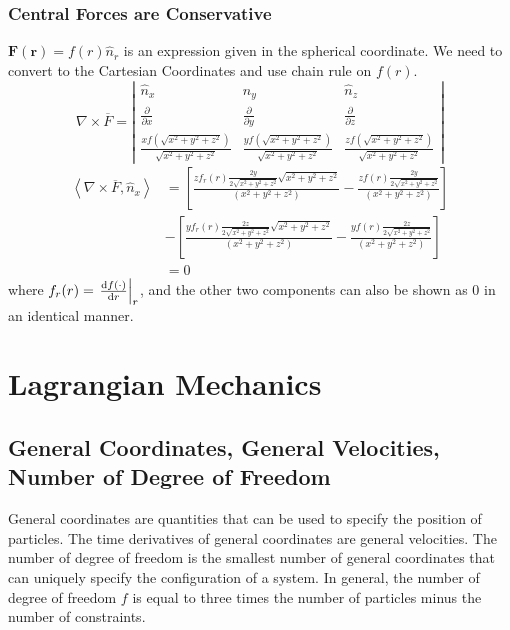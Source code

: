 \documentclass[a4paper,12pt,titlepage]{article}
\begin{document}
\subsubsection{Central Forces are Conservative}
$\mathbf{F(\mathbf{r})}=f(r)\hat{n}_r$ is an expression given in the spherical coordinate. We need to convert to the Cartesian Coordinates and use chain rule on $f(r)$.
\[\nabla\times\overline{F}=\left|\begin{matrix}\hat{n}_x&\hat{n}_y&\hat{n}_z\\\frac{\partial}{\partial x}&\frac{\partial}{\partial y}&\frac{\partial}{\partial z}\\\frac{xf(\sqrt{x^2+y^2+z^2})}{\sqrt{x^2+y^2+z^2}}&\frac{yf(\sqrt{x^2+y^2+z^2})}{\sqrt{x^2+y^2+z^2}}&\frac{zf(\sqrt{x^2+y^2+z^2})}{\sqrt{x^2+y^2+z^2}}\end{matrix}\right|\]
\begin{align*}\left<\nabla\times\overline{F},\hat n_x\right>&=\left[\frac{zf_r(r)\frac{2y}{2\sqrt{x^2+y^2+z^2}}\sqrt{x^2+y^2+z^2}}{(x^2+y^2+z^2)}-\frac{zf(r)\frac{2y}{2\sqrt{x^2+y^2+z^2}}}{(x^2+y^2+z^2)}\right]\\&-\left[\frac{yf_r(r)\frac{2z}{2\sqrt{x^2+y^2+z^2}}\sqrt{x^2+y^2+z^2}}{(x^2+y^2+z^2)}-\frac{yf(r)\frac{2z}{2\sqrt{x^2+y^2+z^2}}}{(x^2+y^2+z^2)}\right]\\
&=0
\end{align*}
where $f_r(r)=\left.\frac{\mathrm{d} f(\cdot)}{\mathrm{d} r}\right|_{r}$, and the other two components can also be shown as $0$ in an identical manner.
\section{Lagrangian Mechanics}
\subsection{General Coordinates, General Velocities, Number of Degree of Freedom}
General coordinates are quantities that can be used to specify the position of particles. The time derivatives of general coordinates are general velocities.
The number of degree of freedom is the smallest number of general coordinates that can uniquely specify the configuration of a system. In general, the number of degree of freedom $f$ is equal to three times the number of particles minus the number of constraints. 
\end{document}
